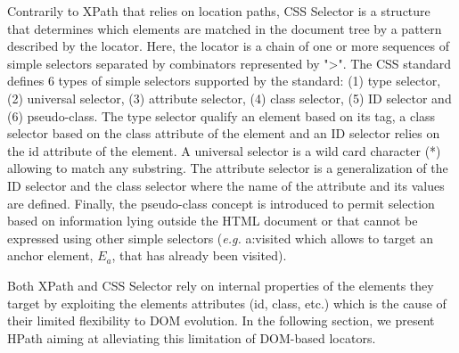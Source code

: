 Contrarily to XPath that relies on location paths, CSS Selector is a structure that determines which elements are matched in the document tree by a pattern described by the locator. Here, the locator is a chain of one or more sequences of simple selectors separated by combinators\cite{W3C2018} represented by ">". The CSS standard defines 6 types of simple selectors supported by the standard: (1) type selector, (2) universal selector, (3) attribute selector, (4) class selector, (5) ID selector and (6) pseudo-class. The type selector qualify an element based on its tag, a class selector based on the class attribute of the element and an ID selector relies on the id attribute of the element. A universal selector is a wild card character (*) allowing to match any substring. The attribute selector is a generalization of the ID selector and the class selector where the name of the attribute and its values are defined. Finally, the pseudo-class concept is introduced to permit selection based on information lying outside the HTML document or that cannot be expressed using other simple selectors (\emph{e.g.} a:visited which allows to target an anchor element, $E_a$, that has already been visited).

Both XPath and CSS Selector rely on internal properties of the elements they target by exploiting the elements attributes (id, class, etc.) which is the cause of their limited flexibility to DOM evolution. In the following section, we present HPath aiming at alleviating this limitation of DOM-based locators.